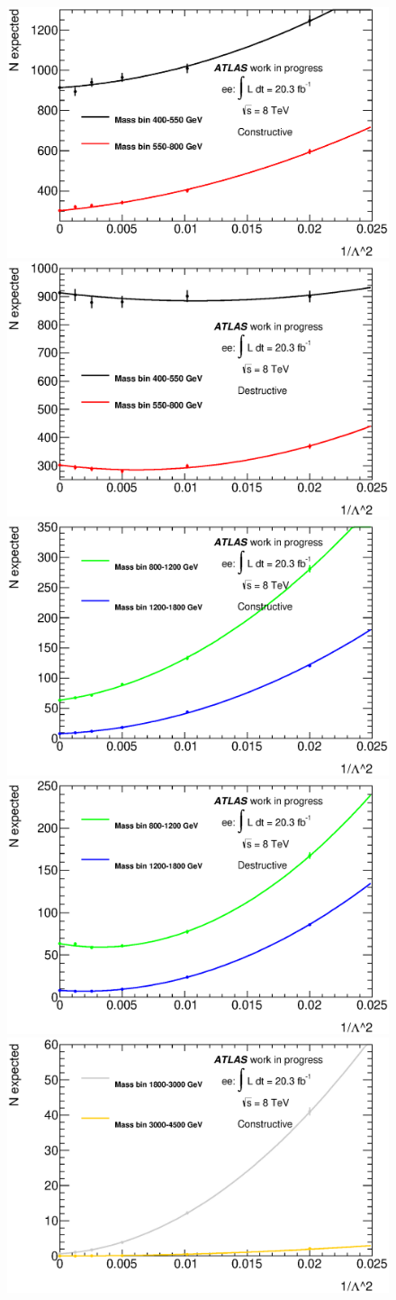 	\begin{figure}[h!]
	    \begin{center}
	    	\includegraphics[width=0.49\linewidth]{images/parametrisations/NexpFits_minus_elec_lowmass.eps}
	    	\includegraphics[width=0.49\linewidth]{images/parametrisations/NexpFits_plus_elec_lowmass.eps} \\
	    	\includegraphics[width=0.49\linewidth]{images/parametrisations/NexpFits_minus_elec_midmass.eps}
	    	\includegraphics[width=0.49\linewidth]{images/parametrisations/NexpFits_plus_elec_midmass.eps} \\
	    	\includegraphics[width=0.49\linewidth]{images/parametrisations/NexpFits_minus_elec_himass.eps}

\end{center}
\end{figure}
